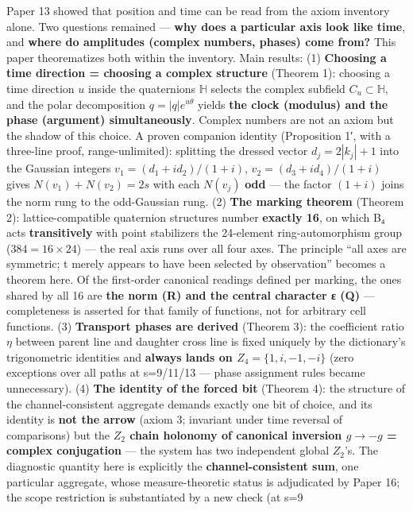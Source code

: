 \documentclass[
]{ltjsarticle}
\begin{document}
Paper 13 showed that position and time can be read from the axiom
inventory alone. Two questions remained --- \textbf{why does a
particular axis look like time}, and \textbf{where do amplitudes
(complex numbers, phases) come from?} This paper theorematizes both
within the inventory. Main results: (1) \textbf{Choosing a time
direction = choosing a complex structure} (Theorem 1): choosing a time
direction \(u\) inside the quaternions \(\mathbb{H}\) selects the
complex subfield \(C_u\subset\mathbb{H}\), and the polar decomposition
\(q=|q|e^{u\theta}\) yields \textbf{the clock (modulus) and the phase
(argument) simultaneously}. Complex numbers are not an axiom but the
shadow of this choice. A proven companion identity (Proposition 1′, with
a three-line proof, range-unlimited): splitting the dressed vector
\(d_j=2|k_j|+1\) into the Gaussian integers \(v_1=(d_1+id_2)/(1+i)\),
\(v_2=(d_3+id_4)/(1+i)\) gives \(N(v_1)+N(v_2)=2s\) with each \(N(v_j)\)
\textbf{odd} --- the factor \((1+i)\) joins the norm rung to the
odd-Gaussian rung. (2) \textbf{The marking theorem} (Theorem 2):
lattice-compatible quaternion structures number \textbf{exactly 16}, on
which B₄ acts \textbf{transitively} with point stabilizers the
24-element ring-automorphism group (\(384=16\times24\)) --- the real
axis runs over all four axes. The principle ``all axes are symmetric; t
merely appears to have been selected by observation'' becomes a theorem
here. Of the first-order canonical readings defined per marking, the
ones shared by all 16 are \textbf{the norm (R) and the central character
ε (Q)} --- completeness is asserted for that family of functions, not
for arbitrary cell functions. (3) \textbf{Transport phases are derived}
(Theorem 3): the coefficient ratio \(\eta\) between parent line and
daughter cross line is fixed uniquely by the dictionary's trigonometric
identities and \textbf{always lands on \(Z_4=\{1,i,-1,-i\}\)} (zero
exceptions over all paths at s=9/11/13 --- phase assignment rules became
unnecessary). (4) \textbf{The identity of the forced bit} (Theorem 4):
the structure of the channel-consistent aggregate demands exactly one
bit of choice, and its identity is \textbf{not the arrow} (axiom 3;
invariant under time reversal of comparisons) but the \textbf{\(Z_2\)
chain holonomy of canonical inversion \(g\to-g\) = complex conjugation}
--- the system has two independent global \(Z_2\)'s. The diagnostic
quantity here is explicitly the \textbf{channel-consistent sum}, one
particular aggregate, whose measure-theoretic status is adjudicated by
Paper 16; the scope restriction is substantiated by a new check (at s=9
\end{document}
